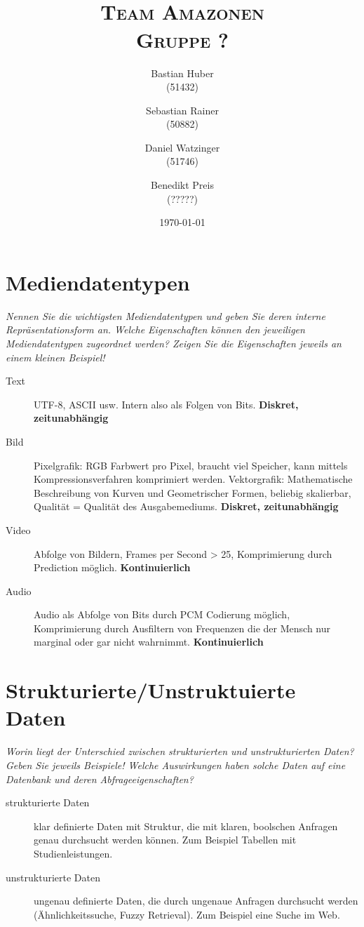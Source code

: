 \documentclass{article}
\author{Bastian Huber\\(51432) \and Sebastian Rainer\\(50882) \and Daniel Watzinger\\(51746) \and Benedikt Preis \\(?????)}
\title{\textbf{\huge{\thetitle}}\\\Large\textsc{Team Amazonen}\\\large\textsc{Gruppe ?}}
\date{\today}
\begin{document}
\hyphenation{}

\maketitle

\pagestyle{fancy}

\section{Mediendatentypen}
\textit{Nennen Sie die wichtigsten Mediendatentypen und geben Sie deren interne Repräsentationsform an. Welche Eigenschaften können den jeweiligen Mediendatentypen zugeordnet werden? Zeigen Sie die Eigenschaften jeweils an einem kleinen Beispiel!}
\begin{description}
	\item[Text] UTF-8, ASCII usw. Intern also als Folgen von Bits. \textbf{Diskret, zeitunabhängig}
	\item[Bild] Pixelgrafik: RGB Farbwert pro Pixel, braucht viel Speicher, kann mittels Kompressionsverfahren komprimiert werden. Vektorgrafik: Mathematische Beschreibung von Kurven und Geometrischer Formen, beliebig skalierbar, Qualität = Qualität des Ausgabemediums. \textbf{Diskret, zeitunabhängig}
	\item[Video] Abfolge von Bildern, Frames per Second > 25, Komprimierung durch Prediction möglich. \textbf{Kontinuierlich}
	\item[Audio] Audio als Abfolge von Bits durch PCM Codierung möglich, Komprimierung durch Ausfiltern von Frequenzen die der Mensch nur marginal oder gar nicht wahrnimmt. \textbf{Kontinuierlich}
\end{description}

\section{Strukturierte/Unstruktuierte Daten}
\textit{Worin liegt der Unterschied zwischen strukturierten und unstrukturierten Daten? Geben Sie jeweils Beispiele! Welche Auswirkungen haben solche Daten auf eine Datenbank und deren Abfrageeigenschaften?}


	\begin{description}
		\item[strukturierte Daten] klar definierte Daten mit Struktur, die mit klaren, boolschen Anfragen genau durchsucht werden können. Zum Beispiel Tabellen mit Studienleistungen.
		\item[unstrukturierte Daten] ungenau definierte Daten, die durch ungenaue Anfragen durchsucht werden (Ähnlichkeitssuche, Fuzzy Retrieval). Zum Beispiel eine Suche im Web. 
	\end{description}
	
\end{document}
